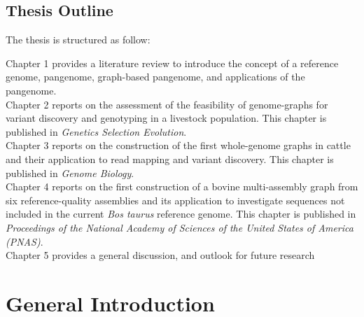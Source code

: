 \documentclass[11 pt, a4paper, notitlepage, twoside]{report}
\begin{document}
\newpage

{}
\section*{\LARGE{Thesis Outline}}
\thispagestyle{plain}

The thesis is structured as follow:

Chapter 1 provides a literature review to introduce the concept of a reference genome, pangenome, graph-based pangenome, and applications of the pangenome. \\

Chapter 2 reports on the assessment of the feasibility of genome-graphs for variant discovery and genotyping in a livestock population. This chapter is published in \emph{Genetics Selection Evolution}. \\ 

Chapter 3 reports on the construction of the first  whole-genome graphs in cattle and their application to read mapping and variant discovery. This chapter is published in \emph{Genome Biology}. \\

Chapter 4 reports on the first construction of a bovine multi-assembly graph from six reference-quality assemblies and its application to investigate sequences not included in the current \emph{Bos taurus} reference genome. This chapter is published in \emph{Proceedings of the National Academy of Sciences of the United States of America (PNAS)}. \\


Chapter 5 provides a general discussion, and outlook for future research


\iftwoside
\cleardoublepage
\newpage
\fi

\newpage



\pagestyle{main}



\onehalfspacing




\chapter[General Introduction]{\LARGE{General Introduction}}
\label{chap:intro}
\end{document}
